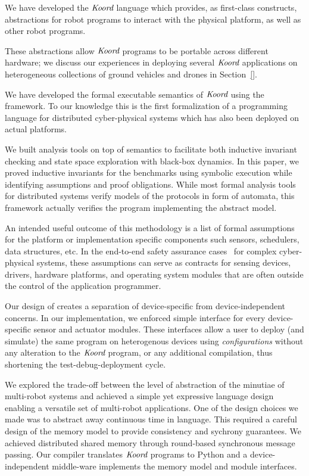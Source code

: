 \begin{noinditem}

\item  {We have developed the $\emph{Koord}$ language which provides, as first-class constructs,  abstractions for robot  programs to interact with the physical platform, as well as other robot programs.}
\item These abstractions allow $\emph{Koord}$ programs to be portable across different hardware; we  discuss our experiences in deploying several $\emph{Koord}$ applications on heterogeneous collections of ground vehicles and drones in Section~\ref{}.
\item  We have developed the formal executable semantics of $\emph{Koord}$ using the \K framework. To our knowledge this is the first formalization of a programming language for distributed cyber-physical systems which has also been deployed on actual platforms.
\item  We built analysis tools on top of semantics to facilitate both inductive invariant checking and state space exploration with black-box dynamics. In this paper, we proved inductive invariants for the benchmarks using symbolic execution while identifying assumptions and proof obligations. While most formal analysis tools for distributed systems verify models of the protocols in form of automata, this framework actually verifies the program implementing the abstract model.
\item An intended useful outcome of this methodology is a list of formal assumptions for the platform or implementation specific components such sensors, schedulers, data structures, etc. In the end-to-end safety assurance cases~\cite{} for complex cyber-physical systems, these assumptions can serve as contracts for sensing devices, drivers, hardware platforms, and operating system modules that are often outside the control of the application programmer.
\item Our design of \lgname creates a separation of device-specific from device-independent concerns. In our implementation, we enforced simple interface for every device-specific sensor and actuator modules. These interfaces allow a user to deploy (and simulate) the same program on heterogenous devices using \emph{configurations} without any alteration to the $\emph{Koord}$ program, or any additional compilation, thus shortening the test-debug-deployment cycle.
\item We explored the trade-off between the level of abstraction of the minutiae of multi-robot systems and achieved a simple yet expressive language design enabling a versatile set of multi-robot applications. One of the design choices we made was to abstract away continuous time in language. This required a careful design of the memory model to provide consistency and sychrony guarantees. We achieved distributed shared memory through round-based synchronous message passing. Our compiler translates $\emph{Koord}$ programs to Python and a device-independent middle-ware implements the memory model and module interfaces.

\end{noinditem}
